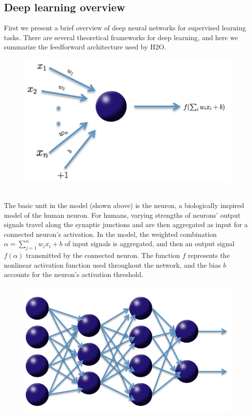 \documentclass[11pt]{article}
\begin{document}
\subsection{Deep learning overview} \label{1.3}

First we present a brief overview of deep neural networks for supervised learning tasks. There are several theoretical frameworks for deep learning, and here we summarize the feedforward architecture used by H2O. 
\\
\begin{figure}[h]
\centering
\includegraphics[scale=0.5]{neuron.png}
\end{figure}
\\
\noindent
The basic unit in the model (shown above) is the neuron, a biologically inspired model of the human neuron. For humans, varying strengths of neurons' output signals travel along the synaptic junctions and are then aggregated  as input for a connected neuron's activation. In the model, the weighted combination $\alpha = \sum_{j=1}^{n} w_i x_i + b$ of input signals is aggregated, and then an output signal $f(\alpha)$ transmitted by the connected neuron. The function $f$ represents the nonlinear activation function used throughout the network, and the bias $b$ accounts for the neuron's activation threshold. 
\\
\begin{figure}[h!]
\centering
\includegraphics[scale=0.3]{net.png}
\end{figure}
\end{document}
